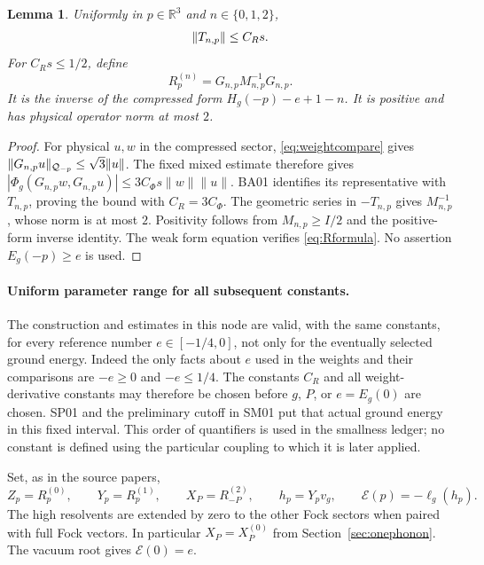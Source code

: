 \documentclass[11pt,a4paper]{article}
\newtheorem{lemma}[theorem]{Lemma}
\theoremstyle{remark}\newtheorem{remark}[theorem]{Remark}
\newcommand{\R}{\mathbb R}\newcommand{\C}{\mathbb C}\newcommand{\N}{\mathbb N}
\newcommand{\Ecal}{\mathcal E}
\begin{document}
\begin{lemma}\label{lem:resolvents}
Uniformly in $p\in\R^3$ and $n\in\{0,1,2\}$,
\[
 \lVert T_{n,p}\rVert\leq C_Rs.
\]
For $C_Rs\leq1/2$, define
\begin{equation}
 R_p^{(n)}=G_{n,p}M_{n,p}^{-1}G_{n,p}.\label{eq:Rformula}
\end{equation}
It is the inverse of the compressed form $H_g(-p)-e+1-n$. It is positive and has physical operator norm at most $2$.
\end{lemma}
\begin{proof}
For physical $u,w$ in the compressed sector, \eqref{eq:weightcompare} gives $\|G_{n,p}u\|_{\mathcal Q_{-p}}\leq\sqrt3\|u\|$. The fixed mixed estimate therefore gives
$|\Phi_g(G_{n,p}w,G_{n,p}u)|\leq3C_\Phi s\|w\|\|u\|$.
BA01 identifies its representative with $T_{n,p}$, proving the bound with $C_R=3C_\Phi$. The geometric series in $-T_{n,p}$ gives $M_{n,p}^{-1}$, whose norm is at most $2$. Positivity follows from $M_{n,p}\geq I/2$ and the positive-form inverse identity. The weak form equation verifies \eqref{eq:Rformula}. No assertion $E_g(-p)\geq e$ is used.
\end{proof}

\paragraph{Uniform parameter range for all subsequent constants.}
The construction and estimates in this node are valid, with the same constants, for every reference number $e\in[-1/4,0]$, not only for the eventually selected ground energy. Indeed the only facts about $e$ used in the weights and their comparisons are $-e\geq0$ and $-e\leq1/4$. The constants $C_R$ and all weight-derivative constants may therefore be chosen before $g$, $P$, or $e=E_g(0)$ are chosen. SP01 and the preliminary cutoff in SM01 put that actual ground energy in this fixed interval. This order of quantifiers is used in the smallness ledger; no constant is defined using the particular coupling to which it is later applied.

Set, as in the source papers,
\begin{equation}
 Z_p=R_p^{(0)},\qquad Y_p=R_p^{(1)},\qquad X_P=R_{-P}^{(2)},\qquad
 h_p=Y_pv_g,\qquad\Ecal(p)=-\ell_g(h_p).
 \label{eq:auxdefs}
\end{equation}
The high resolvents are extended by zero to the other Fock sectors when paired with full Fock vectors. In particular $X_P=X_P^{(0)}$ from Section~\ref{sec:onephonon}. The vacuum root gives $\Ecal(0)=e$.
\end{document}
